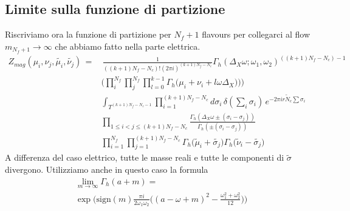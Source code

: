 \documentclass[a4paper,12pt]{article}
\begin{document}
\subsection{Limite sulla funzione di partizione}
Riscriviamo ora la funzione di partizione per $ N_f + 1$ flavours per collegarci al flow $ m_{N_f+1} \rightarrow \infty$ che abbiamo fatto nella parte elettrica.
\begin{align*}
Z_{mag} ( \mu_i , \nu_j , \tilde{\mu_i}, \tilde{\nu_j} ) \,= & \, \frac{1}{ ((k+1)N_f - N_c)! (2 \pi i )^{(k+1)N_f - N_c}}
 \Gamma_h ( \Delta_X \omega ; \omega_1 , \omega_2)^{((k+1)N_f - N_c) -1}  \\
&\bigg( \prod_i^{N_f} \prod_j^{N_f}  \prod_{l=0}^{k-1} \Gamma_h \big( \mu_i+  \nu_i + l \omega \Delta_X) \big)  \bigg) \\
&\int_{T^{(k+1)N_f - N_c-1}}  \prod_{i=1}^{ (k+1)N_f - N_c} d \sigma_i \, \delta( \sum_i \sigma_i) \, 
  e^{- 2 \pi i r \tilde N_c \sum \sigma_i} \\
& \prod_{ 1 \leq i<j \leq (k+1)N_f - N_c } \frac{ \Gamma_h( \Delta_X \omega \pm (\sigma_i - \sigma_j)) }{ \Gamma_h ( \pm (\sigma_i - \sigma_j) )} \\
 &  \prod_{i=1}^{N_f} \prod_{j=1}^{(k+1)N_f - N_c } \Gamma_h \big( \tilde \mu_i + \tilde{\sigma_j} \big) \Gamma_h \big( \tilde \nu_i - \tilde{\sigma_j} \big)  
\end{align*}
A differenza del caso elettrico, tutte le masse reali e tutte le componenti di $\tilde{\sigma}$ divergono.
Utilizziamo anche in questo caso la formula 
\begin{align}
&\lim_{ m \rightarrow \infty } \Gamma_h ( a +  m) = \\
& \exp \bigg( \mbox{sign} (m) \frac{\pi i }{2 \omega_1 \omega_2} \bigg( ( a - \omega + m)^2 - \frac{\omega_1^2 + \omega_2^2}{12} \bigg) \bigg)
\label{eqn:gamma_lim_m}
\end{align}
\end{document}
